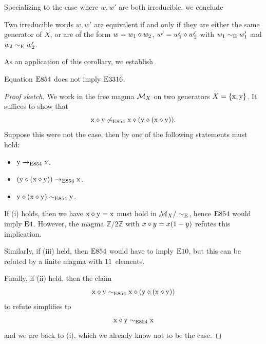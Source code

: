 Specializing to the case where $w,w'$ are both irreducible, we conclude

\begin{corollary}\label{unique-factorization}  Two irreducible words $w, w'$ are equivalent if and only if they are either the same generator of $X$, or are of the form $w = w_1 \diamond w_2$, $w' = w'_1 \diamond w'_2$ with $w_1 \sim_{\mathrm{E}} w'_1$ and $w_2 \sim_{\mathrm{E}} w'_2$.
\end{corollary}

As an application of this corollary, we establish

\begin{proposition}[$\Eq{854} \nmodels \Eq{3316}$]\label{854-3316} Equation $\mathrm{E}854$ does not imply $\mathrm{E}3316$.
\end{proposition}

\begin{proof}[Proof sketch]
  We work in the free magma ${\mathcal{M}}_X$ on two generators $X = \{\mathrm{x},\mathrm{y}\}$.  It suffices to show that
$$  \mathrm{x} \diamond \mathrm{y} \not \sim_{\mathrm{E}854} \mathrm{x} \diamond (\mathrm{y} \diamond (\mathrm{x} \diamond \mathrm{y})).$$
Suppose this were not the case, then by  one of the following statements must hold:
\begin{itemize}
\item[(i)] $\mathrm{y} \to_{\mathrm{E}854} \mathrm{x}$.
\item[(ii)] $(\mathrm{y} \diamond (\mathrm{x} \diamond \mathrm{y})) \to_{\mathrm{E}854} \mathrm{x}$.
\item[(iii)] $\mathrm{y} \diamond (\mathrm{x} \diamond \mathrm{y}) \sim_{\mathrm{E}854} \mathrm{y}$.
\end{itemize}
If (i) holds, then we have $\mathrm{x} \diamond \mathrm{y} = \mathrm{x}$ must hold in ${\mathcal{M}}_X/\sim_{\mathrm{E}}$, hence $\mathrm{E}854$ would imply $\mathrm{E}4$.  However, the magma $\mathbb{Z}/2\mathbb{Z}$ with $x \diamond y = x(1-y)$ refutes this implication.

Similarly, if (iii) held, then $\mathrm{E}854$ would have to imply $\mathrm{E}10$, but this can be refuted by a finite magma with $11$~elements.

Finally, if (ii) held, then the claim
$$  \mathrm{x} \diamond \mathrm{y} \sim_{\mathrm{E}854} \mathrm{x} \diamond (\mathrm{y} \diamond (\mathrm{x} \diamond \mathrm{y}))$$
to refute simplifies to
$$  \mathrm{x} \diamond \mathrm{y} \sim_{\mathrm{E}854} \mathrm{x}$$
and we are back to (i), which we already know not to be the case.
\end{proof}
